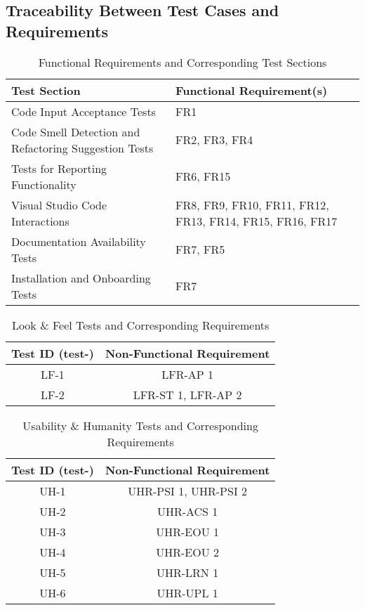\documentclass[12pt, titlepage]{article}
\begin{document}
\newpage\subsection{Traceability Between Test Cases and Requirements}
\label{trace-sys}

\begin{table}[H]
  \centering
  \caption{Functional Requirements and Corresponding Test Sections}
  \begin{tabular}{p{}p{}}
    \toprule \textbf{Test Section} & \textbf{Functional Requirement(s)} \\
    \midrule
    Code Input Acceptance Tests & FR1 \\
    Code Smell Detection and Refactoring Suggestion Tests & FR2, FR3, FR4 \\
    Tests for Reporting Functionality & FR6, FR15 \\
    Visual Studio Code Interactions & FR8, FR9, FR10, FR11, FR12, FR13, FR14, FR15, FR16, FR17 \\
    Documentation Availability Tests & FR7, FR5 \\
    Installation and Onboarding Tests & FR7 \\
    \bottomrule
  \end{tabular}
  \label{tab:sections_requirements}
\end{table}


  \label{tab:nfr-trace-reqs}
  \begin{table}[H]
  \centering
  \caption{Look \& Feel Tests and Corresponding Requirements}
  \label{tab:nfr-trace-lf}
  \begin{tabular}{cc}
    \toprule \textbf{Test ID (test-)} & \textbf{Non-Functional Requirement} \\
    \midrule
    LF-1 & LFR-AP 1 \\
    LF-2 & LFR-ST 1, LFR-AP 2 \\
    \bottomrule
  \end{tabular}
\end{table}


  \begin{table}[H]
  \centering
  \caption{Usability \& Humanity Tests and Corresponding Requirements}
  \label{tab:nfr-trace-uh}
  \begin{tabular}{cc}
    \toprule \textbf{Test ID (test-)} & \textbf{Non-Functional Requirement} \\
    \midrule
    UH-1 & UHR-PSI 1, UHR-PSI 2 \\
    UH-2 & UHR-ACS 1 \\
    UH-3 & UHR-EOU 1 \\
    UH-4 & UHR-EOU 2 \\
    UH-5 & UHR-LRN 1 \\
    UH-6 & UHR-UPL 1 \\
    \bottomrule
  \end{tabular}
\end{table}
\end{document}

